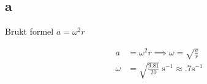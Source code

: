 \subsection{a}

Brukt formel $a = \omega^2 r$

\begin{align}
a &= \omega^2 r \implies \omega = \sqrt{\frac{a}{r}} \\[2mm]
\omega &= \sqrt{\frac{9.81}{20}} \ \mathrm{s^{-1}} \approx .7 \mathrm{s^{-1}}
\end{align}